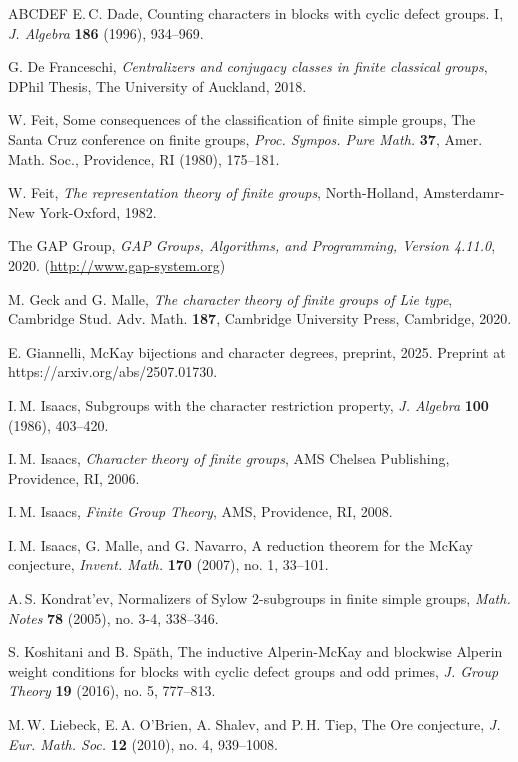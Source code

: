 \documentclass[12pt]{amsart}
\theoremstyle{plain}
\theoremstyle{definition}
\numberwithin{equation}{section}
\begin{document}
\begin{thebibliography}{ABCDEF}
{\sc E.\,C. Dade}, Counting characters in blocks with cyclic defect
groups. I, \emph{J. Algebra} \textbf{186} (1996), 934--969.

G. De Franceschi, \emph{Centralizers and conjugacy classes in finite
classical groups}, DPhil Thesis, The University of Auckland, 2018.


W. Feit, Some consequences of the classification of finite simple
groups, The Santa Cruz conference on finite groups, {\em Proc.
Sympos. Pure Math.} {\bf 37}, Amer. Math. Soc., Providence, RI (1980),
 175--181.

W. Feit, \emph{The representation theory of finite groups},
North-Holland, Amsterdamr-New York-Oxford, 1982.

{\sc The GAP Group}, \emph{GAP Groups, Algorithms, and Programming,
Version 4.11.0}, 2020. (\url{http://www.gap-system.org})

M. Geck and G. Malle, \emph{The character theory of finite groups of
Lie type}, Cambridge Stud. Adv. Math. \textbf{187}, Cambridge
University Press, Cambridge, 2020.

E. Giannelli, McKay bijections and character degrees, preprint,
2025. Preprint at https://arxiv.org/abs/2507.01730.

 I.\,M. Isaacs, Subgroups with the character restriction property,
{\em J. Algebra} {\bf 100} (1986), 403--420.

{I.\,M. Isaacs}, {\em Character theory of finite groups}, AMS
Chelsea Publishing, Providence, RI, 2006.

{I.\,M. Isaacs}, {\em Finite Group Theory}, AMS,
 Providence, RI, 2008.

I.\,M. Isaacs, G. Malle, and G. Navarro, A reduction theorem for the
McKay conjecture, \emph{Invent. Math.} \textbf{170} (2007), no. 1,
33--101.

A.\,S. Kondrat'ev, Normalizers of Sylow $2$-subgroups in finite
simple groups, \emph{Math. Notes} \textbf{78} (2005), no. 3-4,
338--346.

S. Koshitani and B. Sp\"{a}th, The inductive Alperin-McKay and
blockwise Alperin weight conditions for blocks with cyclic defect
groups and odd primes, \emph{J. Group Theory} \textbf{19} (2016),
no. 5, 777--813.

M.\,W. Liebeck, E.\,A. O'Brien, A. Shalev, and P.\,H. Tiep, The Ore
conjecture, \emph{J. Eur. Math. Soc.} \textbf{12} (2010), no. 4,
939--1008.


\end{thebibliography}
\end{document}
